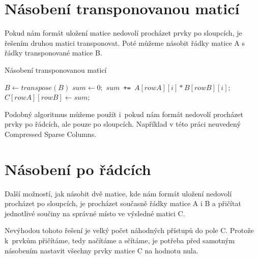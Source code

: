 
\section{Násobení transponovanou maticí}

Pokud nám formát uložení matice nedovolí procházet prvky po sloupcích, je řešením druhou matici transponovat. Poté můžeme násobit řádky matice A s řádky transponované matice B.

\begin{algorithm}[H]
	\caption{Násobení transponovanou maticí}\label{mmm-transpose}
	\begin{algorithmic}[1]
\State \texttt{$B \gets transpose(B)$}
		\State \texttt{$sum \gets 0;$}
			\State \texttt{$sum $ += $ A[rowA][i] * B[rowB][i];$}
		\EndFor
		\State \texttt{$C[rowA][rowB] \gets sum;$}
	\EndFor
\EndFor
		\EndProcedure
	\end{algorithmic}
\end{algorithm}

Podobný algoritmus můžeme použít i~pokud nám formát nedovolí procházet prvky po řádcích, ale pouze po sloupcích. Například v této práci neuvedený Compressed Sparse Columns.



\section{Násobení po řádcích}

Další možností, jak násobit dvě matice, kde nám formát uložení nedovolí procházet po sloupcích, je procházet současně řádky matice A i B a přičítat jednotlivé součiny na správné místo ve výsledné matici C.

Nevýhodou tohoto řešení je velký počet náhodných přístupů do pole C. Protože k~prvkům přičítáme, tedy načítáme a sčítáme, je potřeba před samotným násobením nastavit všechny prvky matice C na hodnotu nula.


